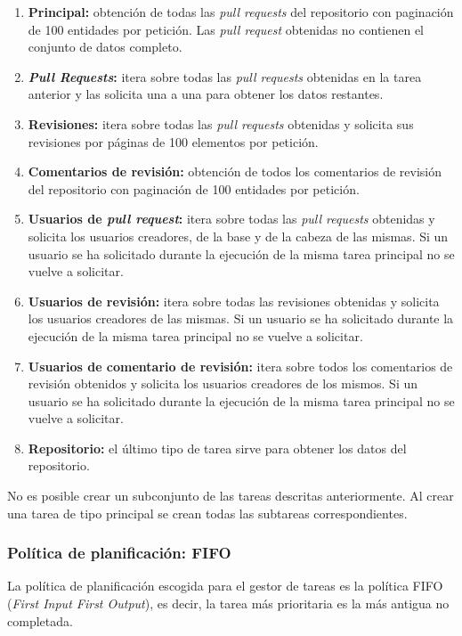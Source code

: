 \begin{enumerate}
\tightlist
	\item \textbf{Principal:} obtención de todas las \textit{pull requests} del repositorio con paginación de 100 entidades por petición. Las \textit{pull request} obtenidas no contienen el conjunto de datos completo.
	\item \textbf{\textit{Pull Requests}:} itera sobre todas las \textit{pull requests} obtenidas en la tarea anterior y las solicita una a una para obtener los datos restantes.
	\item \textbf{Revisiones:} itera sobre todas las \textit{pull requests} obtenidas y solicita sus revisiones por páginas de 100 elementos por petición.
	\item \textbf{Comentarios de revisión:} obtención de todos los comentarios de revisión del repositorio con paginación de 100 entidades por petición.
	\item \textbf{Usuarios de \textit{pull request}:} itera sobre todas las \textit{pull requests} obtenidas y solicita los usuarios creadores, de la base y de la cabeza de las mismas. Si un usuario se ha solicitado durante la ejecución de la misma tarea principal no se vuelve a solicitar.
	\item \textbf{Usuarios de revisión:} itera sobre todas las revisiones obtenidas y solicita los usuarios creadores de las mismas. Si un usuario se ha solicitado durante la ejecución de la misma tarea principal no se vuelve a solicitar.
	\item \textbf{Usuarios de comentario de revisión:} itera sobre todos los comentarios de revisión obtenidos y solicita los usuarios creadores de los mismos. Si un usuario se ha solicitado durante la ejecución de la misma tarea principal no se vuelve a solicitar.
	\item \textbf{Repositorio:} el último tipo de tarea sirve para obtener los datos del repositorio.
\end{enumerate}

No es posible crear un subconjunto de las tareas descritas anteriormente. Al crear una tarea de tipo principal se crean todas las subtareas correspondientes.

\subsubsection{Política de planificación: FIFO}

La política de planificación escogida para el gestor de tareas es la política FIFO (\textit{First Input First Output}), es decir, la tarea más prioritaria es la más antigua no completada.

